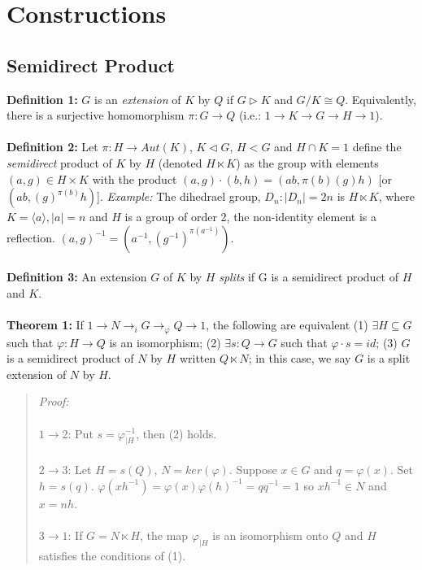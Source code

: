 \chapter{Constructions}
\section {Semidirect Product}
{\bf Definition 1:}
$G$ is an \emph{extension} of $K$ by $Q$ if $G \triangleright K$ and $G/K \cong Q$.  Equivalently,
there is a surjective homomorphism $\pi:G \rightarrow Q$ (i.e.: $1 \rightarrow K \rightarrow G \rightarrow H \rightarrow 1$).
\\
\\
{\bf Definition 2:}
Let $\pi: H \rightarrow Aut(K)$, $K \lhd G$, $H<G$ and $H \cap K = 1$ define the
\emph {semidirect} product of $K$ by $H$ (denoted $H \ltimes K$) as the group with elements
$(a, g) \in H \times K$ with the product $(a, g) \cdot (b, h)= (ab, \pi(b)(g)h)$ [or $(ab, (g)^{\pi(b)}h)$].
\emph{Example:} The dihedrael group, $D_n : |D_n|=2n$ is $H \ltimes K$, where $K= \langle a \rangle, |a|=n$ and
$H$ is a group of order 2, the non-identity element is a reflection.  $(a, g)^{-1} = (a^{-1}, (g^{-1})^{\pi(a^{-1})})$.
\\
\\
{\bf Definition 3:} An extension $G$ of $K$ by $H$ \emph {splits} if G is a semidirect product of $H$ and $K$.
\\
\\
{\bf Theorem 1:}
If $1 \rightarrow N \rightarrow_{i} G \rightarrow_{\varphi} Q \rightarrow 1$, the following
are equivalent
(1) $\exists H \subseteq G$ such that $\varphi: H \rightarrow Q$ is an isomorphism;
(2) $\exists s:Q \rightarrow G$ such that $\varphi \cdot s = id$;
(3) $G$ is a semidirect product of $N$ by $H$ written $Q \ltimes N$; in this
case, we say $G$ is a split extension of $N$ by $H$.
\begin{quote}
\emph{Proof:}
\\
\\
$1 \rightarrow 2$:
Put $s= \varphi_{|H}^{-1}$, then (2) holds.
\\
\\
$2 \rightarrow 3$:
Let $H= s(Q)$, $N= ker(\varphi)$.  Suppose $x \in G$ and $q= \varphi(x)$.  Set
$h= s(q)$.  $\varphi(x h^{-1})= \varphi(x) \varphi(h)^{-1} = q q^{-1}= 1$ so
$x h^{-1} \in N$ and $x= nh$.
\\
\\
$3 \rightarrow 1$:
If $G= N \ltimes H$, the map $\varphi_{|H}$ is an isomorphism onto $Q$ and $H$ satisfies the
conditions of (1).
\end{quote}
